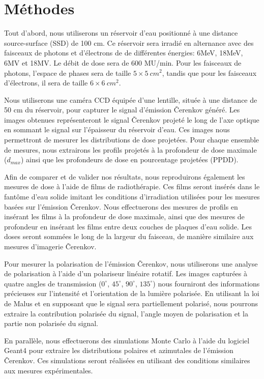 \documentclass{Thesis}
\begin{document}
\section*{Méthodes}
Tout d'abord, nous utiliserons un réservoir d'eau positionné à une distance source-surface (SSD) de 100 cm.
Ce réservoir sera irradié en alternance avec des faisceaux de photons et d'électrons de de différentes énergies: 6MeV, 18MeV, 6MV et 18MV.
Le débit de dose sera de 600 MU/min.
Pour les faisceaux de photons, l'espace de phases sera de taille $5 \times \SI{5}{cm^2}$, tandis que pour les faisceaux d'électrons, il sera de taille $6 \times \SI{6}{cm^2}$.

Nous utiliserons une caméra CCD équipée d'une lentille, située à une distance de 50 cm du réservoir, pour capturer le signal d'émission Čerenkov généré.
Les images obtenues représenteront le signal Čerenkov projeté le long de l'axe optique en sommant le signal sur l'épaisseur du réservoir d'eau.
Ces images nous permettront de mesurer les distributions de dose projetées.
Pour chaque ensemble de mesures, nous extrairons les profils projetés à la profondeur de dose maximale ($d_{max}$) ainsi que les profondeurs de dose en pourcentage projetées (PPDD).

Afin de comparer et de valider nos résultats, nous reproduirons également les mesures de dose à l'aide de films de radiothérapie.
Ces films seront insérés dans le fantôme d'eau solide imitant les conditions d'irradiation utilisées pour les mesures basées sur l'émission Čerenkov.
Nous effectuerons des mesures de profils en insérant les films à la profondeur de dose maximale, ainsi que des mesures de profondeur en insérant les films entre deux couches de plaques d'eau solide.
Les doses seront sommées le long de la largeur du faisceau, de manière similaire aux mesures d'imagerie Čerenkov.

Pour mesurer la polarisation de l'émission Čerenkov, nous utiliserons une analyse de polarisation à l'aide d'un polariseur linéaire rotatif.
Les images capturées à quatre angles de transmission ($0^\circ$, $45^\circ$, $90^\circ$, $135^\circ$) nous fourniront des informations précieuses sur l'intensité et l'orientation de la lumière polarisée.
En utilisant la loi de Malus et en supposant que le signal sera partiellement polarisé, nous pourrons extraire la contribution polarisée du signal, l'angle moyen de polarisation et la partie non polarisée du signal.

En parallèle, nous effectuerons des simulations Monte Carlo à l'aide du logiciel Geant4 pour extraire les distributions polaires et azimutales de l'émission Čerenkov.
Ces simulations seront réalisées en utilisant des conditions similaires aux mesures expérimentales.
\end{document}
